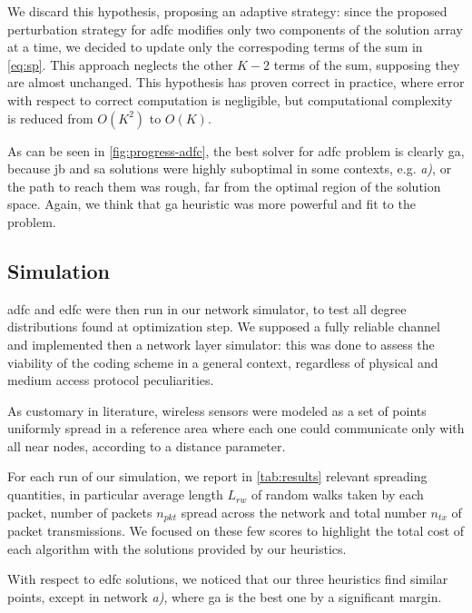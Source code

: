 \documentclass[12pt,journal,draftclsnofoot,onecolumn]{IEEEtran}
\makeatletter
\let\origsubsubsection\subsubsection
\renewcommand\subsubsection{\@ifstar{\starsubsubsection}{\nostarsubsubsection}}
\newcommand\nostarsubsubsection[1]
{\subsubsectionprelude\origsubsubsection{#1}}
\newcommand\subsubsectionprelude{%
  \vspace{6pt}
}
\makeatother
\begin{document}
We discard this hypothesis, proposing an adaptive strategy:
since the proposed perturbation strategy for \gls{adfc} modifies only two components of the solution array at a time, we decided to update only the correspoding terms of the sum in \autoref{eq:sp}.
This approach neglects the other $K-2$ terms of the sum, supposing they are almost unchanged.
This hypothesis has proven correct in practice, where error with respect to correct computation is negligible, but computational complexity is reduced from $O(K^2)$ to $O(K)$.

As can be seen in \autoref{fig:progress-adfc}, the best solver for \gls{adfc} problem is clearly \gls{ga}, because \gls{jb} and \gls{sa} solutions were highly suboptimal in some contexts, e.g. \emph{a)}, or the path to reach them was rough, far from the optimal region of the solution space.
Again, we think that \gls{ga} heuristic was more powerful and fit to the problem.

\subsection{Simulation}
\gls{adfc} and \gls{edfc} were then run in our network simulator, to test all degree distributions found at optimization step.
We supposed a fully reliable channel and implemented then a network layer simulator: this was done to assess the viability of the coding scheme in a general context, regardless of physical and medium access protocol peculiarities.

As customary in literature, wireless sensors were modeled as a set of points uniformly spread in a reference area where each one could communicate only with all near nodes, according to a distance parameter.

\subsubsection{Transmission cost}
For each run of our simulation, we report in \autoref{tab:results} relevant spreading quantities, in particular average length $L_{rw}$ of random walks taken by each packet, number of packets $n_{pkt}$ spread across the network and total number $n_{tx}$ of packet transmissions.
We focused on these few scores to highlight the total cost of each algorithm with the solutions provided by our heuristics.

\smallbreak
With respect to \gls{edfc} solutions, we noticed that our three heuristics find similar points, except in network \emph{a)}, where \gls{ga} is the best one by a significant margin.
\end{document}
